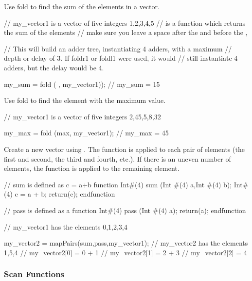 Use fold to find the sum of the elements in a vector.
\begin{libverbatim}
     // my_vector1 is a vector of five integers {1,2,3,4,5}
     // \+ is a function which returns the sum of the elements
     // make sure you leave a space after the \+ and before the ,
          
     // This will build an adder tree, instantiating 4 adders, with a maximum
     // depth or delay of 3.  If foldr1 or foldl1 were used, it would
     // still instantiate 4 adders, but the delay would be 4.

     my_sum =  fold (\+ , my_vector1));
     // my_sum = 15
\end{libverbatim}

Use fold to find the element with the maximum value.
\begin{libverbatim}
     // my_vector1 is a vector of five integers  {2,45,5,8,32}

     my_max = fold (max, my_vector1);
     // my_max = 45 
\end{libverbatim}

Create a new vector using .  The function  is applied
to each pair of elements (the first and second, the third and fourth,
etc.).  If there is an uneven number of elements, the function  is
applied to the remaining element.
\begin{libverbatim}
     // sum is defined as c = a+b
     function Int#(4) sum (Int #(4) a,Int #(4) b);
          Int#(4) c = a + b;
          return(c);
     endfunction

     // pass is defined as a
     function Int#(4) pass (Int #(4) a);
          return(a);
     endfunction

     // my_vector1 has the elements {0,1,2,3,4}

     my_vector2 = mapPairs(sum,pass,my_vector1);    
     // my_vector2 has the elements {1,5,4}
     // my_vector2[0] = 0 + 1
     // my_vector2[1] = 2 + 3
     // my_vector2[2] = 4   
\end{libverbatim}


\subsubsection{Scan Functions}

